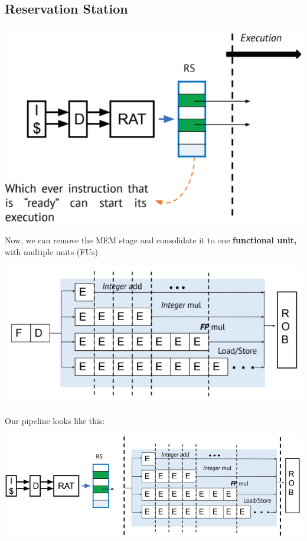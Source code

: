 \documentclass[10pt]{article}
\begin{document}
\subsection*{Reservation Station}
\begin{center}
    \includegraphics*[scale=0.8]{W5_8.png}
\end{center}
Now, we can remove the MEM stage and consolidate it to one \textbf{functional unit,} with multiple units (FUs)
\begin{center}
    \includegraphics*[scale=0.8]{W5_9.png}
\end{center}
Our pipeline looks like this:
\begin{center}
    \includegraphics*[scale=0.8]{W5_10}
\end{center}
\end{document}
